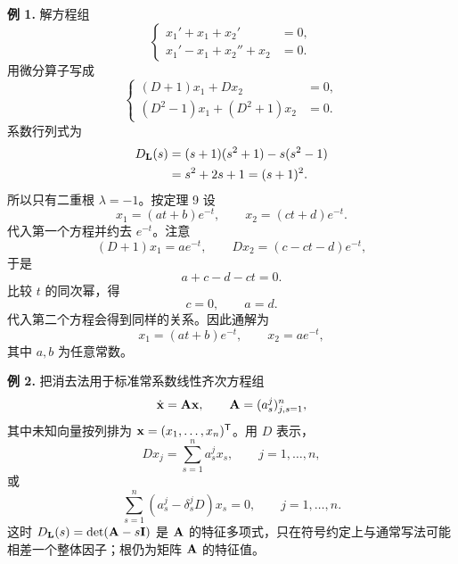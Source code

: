 \noindent\textbf{例 1.}
解方程组
\begin{equation}
 \left\{
 \begin{aligned}
  x_1'+x_1+x_2'&=0,\\
  x_1'-x_1+x_2''+x_2&=0.
 \end{aligned}
 \right.
 \label{eq:ch2-11-example1}
\end{equation}
用微分算子写成
\begin{equation}
 \left\{
 \begin{aligned}
  (D+1)x_1+Dx_2&=0,\\
  (D^2-1)x_1+(D^2+1)x_2&=0.
 \end{aligned}
 \right.
 \label{eq:ch2-11-example1-operator}
\end{equation}
系数行列式为
\begin{align*}
 D_{\mathbf{L}}(s)
 &=(s+1)(s^2+1)-s(s^2-1)\\
 &=s^2+2s+1=(s+1)^2.
\end{align*}
所以只有二重根 \(\lambda=-1\)。按定理 9 设
\[
 x_1=(at+b)e^{-t},
 \qquad
 x_2=(ct+d)e^{-t}.
\]
代入第一个方程并约去 \(e^{-t}\)。注意
\[
 (D+1)x_1=a e^{-t},
 \qquad
 D x_2=(c-ct-d)e^{-t},
\]
于是
\[
 a+c-d-ct=0.
\]
比较 \(t\) 的同次幂，得
\[
 c=0,\qquad a=d.
\]
代入第二个方程会得到同样的关系。因此通解为
\begin{equation}
 x_1=(at+b)e^{-t},
 \qquad
 x_2=ae^{-t},
 \label{eq:ch2-11-example1-general}
\end{equation}
其中 \(a,b\) 为任意常数。

\noindent\textbf{例 2.}
把消去法用于标准常系数线性齐次方程组
\begin{equation}
 \dot{\vect{x}}=\mat{A}\vect{x},
 \qquad
 \mat{A}=(a_s^j)_{j,s=1}^n,
 \label{eq:ch2-11-standard-linear-system}
\end{equation}
其中未知向量按列排为 \(\vect{x}=(x_1,\ldots,x_n)^{\mathsf T}\)。用 \(D\) 表示，
\[
 D x_j=\sum_{s=1}^na_s^jx_s,
 \qquad j=1,\ldots,n,
\]
或
\begin{equation}
 \sum_{s=1}^n(a_s^j-\delta_s^jD)x_s=0,
 \qquad j=1,\ldots,n.
 \label{eq:ch2-11-standard-matrix-equation}
\end{equation}
这时 \(D_{\mathbf{L}}(s)=\det(\mathbf{A}-s\mathbf{I})\) 是 \(\mathbf{A}\) 的特征多项式，只在符号约定上与通常写法可能相差一个整体因子；根仍为矩阵 \(\mathbf{A}\) 的特征值。

